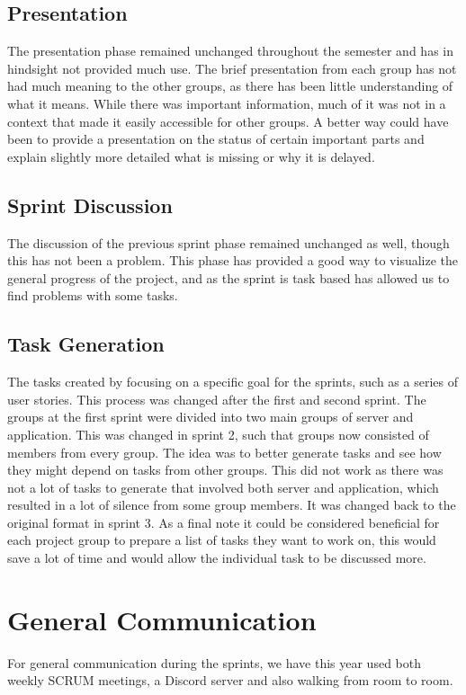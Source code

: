 \subsection{Presentation}
The presentation phase remained unchanged throughout the semester and has in
hindsight not provided much use. The brief presentation from each group has not
had much meaning to the other groups, as there has been little understanding of
what it means. While there was important information, much of it was not in a
context that made it easily accessible for other groups. A better way could have
been to provide a presentation on the status of certain important parts and
explain slightly more detailed what is missing or why it is delayed.\nl

\subsection{Sprint Discussion}
The discussion of the previous sprint phase remained unchanged as well,
though this has not been a problem. This phase has provided a good way to
visualize the general progress of the project, and as the sprint is task based
has allowed us to find problems with some tasks.\nl

\subsection{Task Generation}
The tasks created by focusing on a specific goal for the sprints, such as a
series of user stories. This process was changed after the first and second
sprint. The groups at the first sprint were divided into two main groups of
server and application. This was changed in sprint 2, such that groups now
consisted of members from every group. The idea was to better generate tasks and
see how they might depend on tasks from other groups. This did not work as there
was not a lot of tasks to generate that involved both server and application, which
resulted in a lot of silence from some group members. It was changed back to the
original format in sprint 3. As a final note it could be considered beneficial
for each project group to prepare a list of tasks they want to work on, this
would save a lot of time and would allow the individual task to be discussed
more.

\section{General Communication}
For general communication during the sprints, we have this year used both weekly
SCRUM meetings, a Discord server and also walking from room to room.

